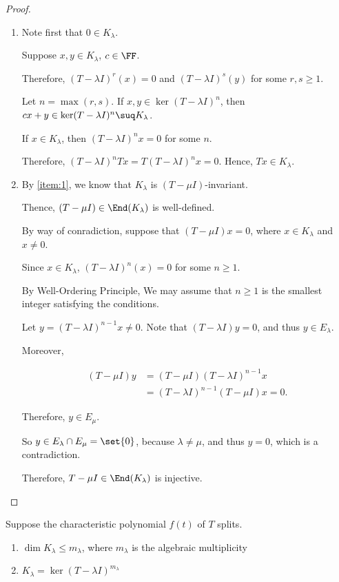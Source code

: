 \documentclass[11pt]{scrartcl}
\begin{document}
  \begin{proof}
    \hfill
    \begin{enumerate}[label=\alph*)]
    \item
      \label{item:1}
      Note first that $0\in K_{\lambda}$.

      Suppose $x, y\in K_{\lambda}$, $c\in \FF$.

      Therefore, $(T-\lambda I)^r(x) = 0$ and $(T-\lambda I)^{s}(y)$ for some $r, s \geq 1$.

      Let $n = \max(r, s)$. If $x, y \in \ker (T-\lambda I)^n$, then
      $cx+y \in \ker (T-\lambda I)^n \suq K_{\lambda}$.

      If $x\in K_{\lambda}$, then $(T-\lambda I)^nx = 0$ for some
      $n$.

      Therefore, $(T-\lambda I)^n Tx = T(T-\lambda I)^nx = 0$. Hence,
      $Tx \in K_{\lambda}$.
    \item By \ref{item:1}, we know that $K_{\lambda}$ is $(T-\mu I)$-invariant.

      Thence, $(T-\mu I) \in \End(K_{\lambda})$ is well-defined.

      By way of conradiction, suppose that $(T-\mu I)x = 0$, where
      $x\in K_{\lambda}$ and $x\neq 0$.

      Since $x\in K_{\lambda}$, $(T-\lambda I)^n(x) = 0$ for some $n \geq 1$.

      By Well-Ordering Principle, We may assume that $n \geq 1$ is the
      smallest integer satisfying the conditions.

      Let $y = (T-\lambda I)^{n-1}x \neq 0$. Note that
      $(T-\lambda I)y = 0$, and thus $y\in E_{\lambda}$.

      Moreover,

      \begin{align}
        (T-\mu I) y &= (T-\mu I)(T-\lambda I)^{n-1}x\\
                    &= (T-\lambda I)^{n-1}(T-\mu I) x = 0.
      \end{align}

      Therefore, $y\in E_{\mu}$.

      So $y \in E_{\lambda}\cap E_{\mu} = \set{0}$, because
      $\lambda\neq\mu$, and thus $y=0$, which is a contradiction.

      Therefore, $T-\mu I \in \End(K_{\lambda})$ is injective.
    \end{enumerate}
  \end{proof}

  \begin{theorem}
    Suppose the characteristic polynomial $f(t)$ of $T$ splits.

    \begin{enumerate}[label=\alph*)]
    \item \label{item:3} $\dim K_{\lambda} \leq m_{\lambda}$, where $m_{\lambda}$ is the algebraic  multiplicity
    \item $K_{\lambda}= \ker (T-\lambda I)^{m_{\lambda}}$
    \end{enumerate}
  \end{theorem}
\end{document}
